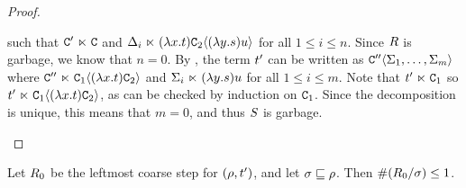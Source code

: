 \begin{proof}
\begin{enumerate}
  such that $\mathtt{C}' \mathrel{\ltimes} \mathtt{C}$ and $\Delta_i \mathrel{\ltimes} (\lambda x. t)\mathtt{C}_2\langle(\lambda y. s)u\rangle$ for all $1 \leq i \leq n$.
  Since $R$ is garbage, we know that $n = 0$.
  By ,
  the term $t'$ can be written as $\mathtt{C}''\langle\Sigma_1,\hdots,\Sigma_m\rangle$
  where $\mathtt{C}'' \mathrel{\ltimes} \mathtt{C}_1\langle(\lambda x. t)\mathtt{C}_2\rangle$
  and $\Sigma_i \mathrel{\ltimes} (\lambda y. s)u$ for all $1 \leq i \leq m$.
  Note that $t' \mathrel{\ltimes} \mathtt{C}_1$ so $t' \mathrel{\ltimes} \mathtt{C}_1\langle(\lambda x. t)\mathtt{C}_2\rangle$,
  as can be checked by induction on $\mathtt{C}_1$.
  Since the decomposition is unique, this means that $m = 0$,
  and thus $S$ is garbage.
\end{enumerate}
\end{proof}


\begin{lemma}
Let $R_0$ be the leftmost coarse step for $(\rho,t')$,
and let $\sigma \sqsubseteq \rho$.
Then $\#(R_0/\sigma) \leq 1$.
\end{lemma}
